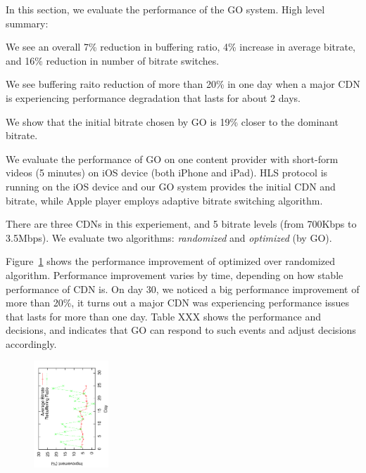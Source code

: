 
In this section, we evaluate the performance of the GO system. High level summary:
\begin{packedenumerate}
    \item We see an overall 7\% reduction in buffering ratio, 4\% increase in average bitrate, and 16\% reduction in number of bitrate switches.
    \item We see buffering raito reduction of more than 20\% in one day when a major CDN is experiencing performance degradation that lasts for about 2 days.
    \item We show that the initial bitrate chosen by GO is 19\% closer to the dominant bitrate.
\end{packedenumerate}


We evaluate the performance of GO on one content provider with short-form videos (5 minutes) on iOS device (both iPhone and iPad). 
HLS protocol is running on the iOS device and our GO system provides the initial CDN and bitrate, while Apple player employs adaptive 
bitrate switching algorithm. 

There are three CDNs in this experiement, and 5 bitrate levels (from 700Kbps to 3.5Mbps). We evaluate two algorithms: {\it randomized} 
and {\it optimized} (by GO).


Figure~\ref{fig:perf-impr} shows the performance improvement of optimized over randomized algorithm. Performance improvement varies by time,
depending on how stable performance of CDN is. On day 30, we noticed a big performance improvement of more than 20\%,
it turns out a major CDN was experiencing performance issues that lasts for more than one day. Table XXX shows the 
performance and decisions, and indicates that GO can respond to such events and adjust decisions accordingly.

\begin{figure}[h!]
\centering
 \includegraphics[width=0.25\textwidth, angle=270] {figures/eval-perfimp.pdf}
\label{fig:perf-impr}
\end{figure}


